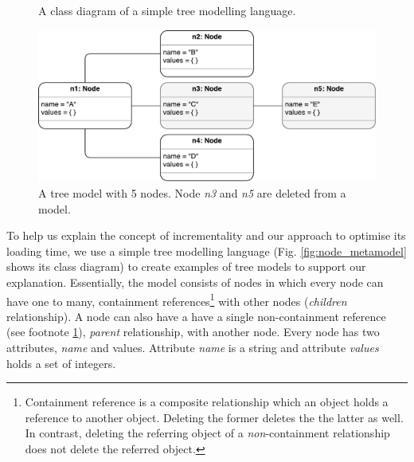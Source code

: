 \documentclass{llncs}
\begin{document}
\begin{figure}[ht]
\begin{minipage}[t]{0.39\linewidth}
    \centering
    \caption{A class diagram of a simple tree modelling language.}
    \label{fig:node_metamodel}
\end{minipage}
    \hfill
\begin{minipage}[t]{0.59\linewidth}
    \includegraphics[width=\linewidth]{initial_chart}
    \caption{A tree model with 5 nodes. Node \emph{n3} and \emph{n5} are deleted from a model.}
    \label{fig:initial_model}
\end{minipage} 
\end{figure}

To help us explain the concept of incrementality and our approach to optimise its loading time, we use a simple tree modelling language (Fig. \ref{fig:node_metamodel} shows its class diagram) to create examples of  tree models to support our explanation. Essentially, the model consists of nodes in which every node can have one to many, containment references\footnote{\label{fn:containment_reference}Containment reference is a composite relationship which an object holds a reference to another object. Deleting the former deletes the the latter as well. In contrast, deleting the referring object of a \emph{non}-containment relationship does not delete the referred object.} with other nodes (\emph{children} relationship). A node can also have a have a single non-containment reference (see footnote \ref{fn:containment_reference}), \emph{parent} relationship, with another node. Every node has two attributes, \emph{name} and {values}. Attribute \emph{name} is a string and attribute \emph{values} holds a set of integers.
\end{document}
